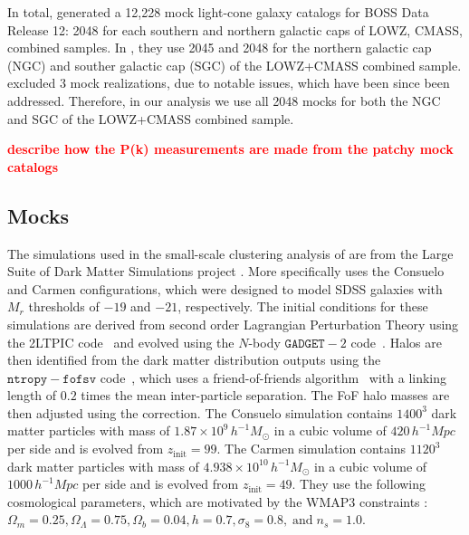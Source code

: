 \documentclass[12pt, letterpaper, preprint]{aastex}
\newcommand{\todo}[1]{{\bf \textcolor{red}{#1}}}
\begin{document}
In total, \cite{kitaura2016} generated a 12,228 mock light-cone 
galaxy catalogs for BOSS Data Release 12: 2048 for each southern 
and northern galactic caps of LOWZ, CMASS, combined samples. 
In \cite{beutler2017}, they use 2045 and 2048 for the northern 
galactic cap (NGC) and souther galactic cap (SGC) of the LOWZ+CMASS
combined sample. \cite{beutler2017} excluded 3 mock realizations, 
due to notable issues, which have been since been addressed. Therefore, 
in our analysis we use all 2048 mocks for both the NGC and SGC of 
the LOWZ+CMASS combined sample.

\todo{describe how the P(k) measurements are made from the patchy mock catalogs} 

\subsection{\cite{sinha2017a} Mocks}
The simulations used in the small-scale clustering analysis of \cite{sinha2017a} 
are from the Large Suite of Dark Matter Simulations project 
\citep[LasDamas][]{mcbride2009}. More specifically \cite{sinha2017a} uses
the Consuelo and Carmen configurations, which were designed to model SDSS 
galaxies with $M_r$ thresholds of $-19$ and $-21$, respectively.
The initial conditions for these simulations are derived from second order 
Lagrangian Perturbation Theory using the 2LTPIC code~\citep{scoccimarro1998, crocce2006}
and evolved using the $N$-body $\mathtt{GADGET}-2$ code~\citep{springel2005}.
Halos are then identified from the dark matter distribution outputs using 
the $\mathtt{ntropy-fofsv}$ code~\citep{gardner2007}, which uses a 
friend-of-friends algorithm~\citep[FoF][]{davis1985} with a linking length of $0.2$
times the mean inter-particle separation. The FoF halo masses are then adjusted 
using the \cite{warren2006} correction. 
The Consuelo simulation contains $1400^3$ dark matter particles with 
mass of $1.87 \times 10^9\,h^{-1} M_\odot$ in a cubic volume of 
$420\,h^{-1} Mpc$ per side and is evolved from $z_\mathrm{init} = 99$. 
The Carmen simulation contains $1120^3$ dark matter particles with mass 
of $4.938 \times 10^{10}\,h^{-1} M_\odot$ in a cubic volume of 
$1000\,h^{-1} Mpc$ per side and is evolved from $z_\mathrm{init} = 49$. 
They use the following cosmological parameters, which are motivated 
by the WMAP3 constraints \citep{spergel2007}:
$\Omega_m = 0.25, \Omega_\Lambda = 0.75, \Omega_b = 0.04, h = 0.7, \sigma_8 = 0.8,\;\mathrm{and}\;n_s = 1.0.$
\end{document}
